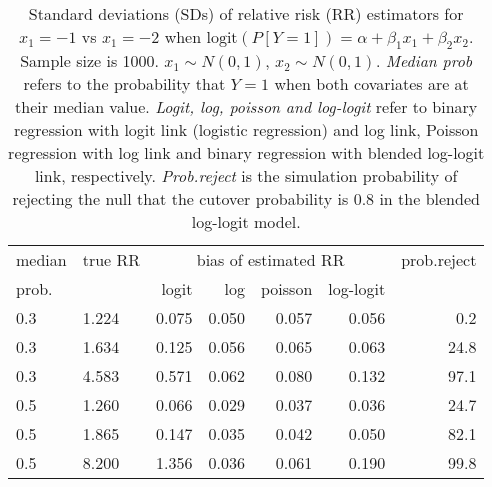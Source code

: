 \documentclass[12pt,a4paper]{article}
\begin{document}
\begin{table}[H] 
\small\sf\centering 
\caption{Standard deviations (SDs) of relative risk (RR) estimators for $x_1=-1$ vs $x_1=-2$ when $\mbox{logit}(P[Y=1])=\alpha+\beta_1 x_1 + \beta_2 x_2$. Sample size is 1000. $x_1 \sim $$N(0,1)$, $x_2 \sim N(0,1)$. {\it Median prob} refers to the probability that $Y=1$ when both covariates are at their median value. {\it Logit, log, poisson and log-logit} refer to binary regression with logit link (logistic regression) and log link, Poisson regression with log link and binary regression with blended log-logit link, respectively. {\it Prob.reject} is the simulation probability of rejecting the null that the cutover probability is $0.8$ in the blended log-logit model.} 
\begin{tabular}{llrrrrr} 
\toprule 
median & true RR & \multicolumn{4}{c}{bias of estimated RR} & prob.reject \\ 
prob. & & logit & log & poisson & log-logit  & \\ \midrule 
0.3 & 1.224 & 0.075 & 0.050 & 0.057 & 0.056 &  0.2 \\  
0.3 & 1.634 & 0.125 & 0.056 & 0.065 & 0.063 & 24.8 \\  
0.3 & 4.583 & 0.571 & 0.062 & 0.080 & 0.132 & 97.1 \\  
0.5 & 1.260 & 0.066 & 0.029 & 0.037 & 0.036 & 24.7 \\  
0.5 & 1.865 & 0.147 & 0.035 & 0.042 & 0.050 & 82.1 \\  
0.5 & 8.200 & 1.356 & 0.036 & 0.061 & 0.190 & 99.8 \\  
\bottomrule 
\end{tabular} 
\end{table} 
\end{document}
